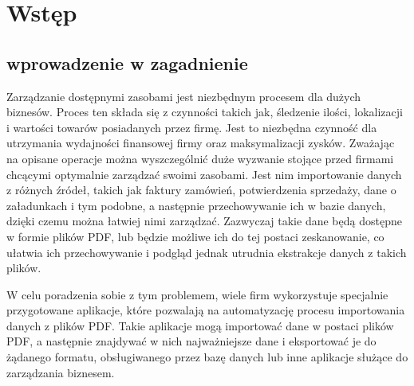 \documentclass[a4paper,twoside,12pt]{book}
\newcounter{stronyPozaNumeracja}
\begin{document}
\tableofcontents

\setcounter{stronyPozaNumeracja}{\value{page}}
\mainmatter
\pagestyle{empty}

\cleardoublepage

\pagestyle{NumeryStronNazwyRozdzialow}


\chapter{Wstęp}


\section{wprowadzenie w zagadnienie}

Zarządzanie dostępnymi zasobami jest niezbędnym procesem dla dużych biznesów. Proces ten składa się z czynności takich jak, śledzenie ilości, lokalizacji i wartości towarów posiadanych przez firmę. Jest to niezbędna czynność dla utrzymania wydajności finansowej firmy oraz maksymalizacji zysków. Zważając na opisane operacje można wyszczególnić duże wyzwanie stojące przed firmami chcącymi optymalnie zarządzać swoimi zasobami. Jest nim importowanie danych z różnych źródeł, takich jak faktury zamówień, potwierdzenia sprzedaży, dane o załadunkach i tym podobne, a następnie przechowywanie ich w bazie danych, dzięki czemu można łatwiej nimi zarządzać. Zazwyczaj takie dane będą dostępne w formie plików PDF, lub będzie możliwe ich do tej postaci zeskanowanie, co ułatwia ich przechowywanie i podgląd jednak utrudnia ekstrakcje danych z takich plików. 

W celu poradzenia sobie z tym problemem, wiele firm wykorzystuje specjalnie przygotowane aplikacje, które pozwalają na automatyzację procesu importowania danych z plików PDF. Takie aplikacje mogą importować dane w postaci plików PDF, a następnie znajdywać w nich najważniejsze dane i eksportować je do żądanego formatu, obsługiwanego przez bazę danych lub inne aplikacje służące do zarządzania biznesem. 
\end{document}
